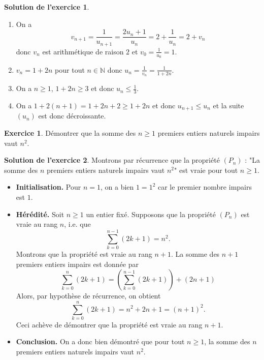 \documentclass[a4paper, 11pt,openany]{article}%
\theoremstyle{plain}
\theoremstyle{definition}
\newtheorem{exo}{Exercice}
\newtheorem{sol}{Solution de l'exercice}
\theoremstyle{remark}
\newcommand{\N}{\mathbb{N}}
\begin{document}
\begin{sol}
\begin{enumerate}
\item On a
\[ v_{n+1} = \frac{1}{u_{n+1}} = \frac{2u_n +1}{u_n} = 2 + \frac{1}{u_n} = 2 + v_n\]
donc $v_n$ est arithmétique de raison $2$ et $v_0 = \frac{1}{u_0} = 1$.
\item $v_n = 1 + 2n$ pour tout $n \in \N$ donc $u_n = \frac{1}{v_n} = \frac{1}{1 + 2n}$.
\item On a $n \geqslant 1$, $1 + 2n \geqslant 3$ et donc $u_n \leqslant \frac{1}{3}$.
\item On a $1 + 2 (n+1) = 1 + 2n + 2 \geqslant 1 +2n$ et donc $u_{n+1} \leqslant u_n$ et la suite $(u_n)$ est donc décroissante.
\end{enumerate}
\end{sol}
   


\begin{exo}
Démontrer que la somme des $n \geqslant 1$ premiers entiers naturels impairs vaut $n^2$.
\end{exo}

\begin{sol}
Montrons par récurrence que la propriété $(P_n)$ : "La somme des $n$ premiers entiers naturels impairs vaut $n^2$" est vraie pour tout $n \geqslant 1$.
 \begin{itemize}
 \item \textbf{Initialisation.} Pour $n = 1$, on a bien $1 = 1^2$ car le premier nombre impairs est $1$.
 \item \textbf{Hérédité.} Soit $n \geqslant 1$ un entier fixé. Supposons que la propriété $(P_n)$ est vraie au rang $n$, i.e. que \[ \sum_{k=0}^{n-1} (2k+1) = n^2.\]
 Montrons que la propriété est vraie au rang $n+1$. La somme des $n+1$ premiers entiers impairs est donnée par
 \[ \sum_{k=0}^{n} (2k+1) = \left( \sum_{k=0}^{n-1} (2k+1) \right) + (2n+1)\]
 Alors, par hypothèse de récurrence, on obtient
 \[ \sum_{k=0}^{n} (2k+1) = n^2 + 2n +1 = (n+1)^2.\]
 Ceci achève de démontrer que la propriété est vraie au rang $n+1$.
 \item \textbf{Conclusion.} On a donc bien démontré que pour tout $n \geqslant 1$, la somme des $n$ premiers entiers naturels impairs vaut $n^2$.
 \end{itemize}
\end{sol}


%
\end{document}
